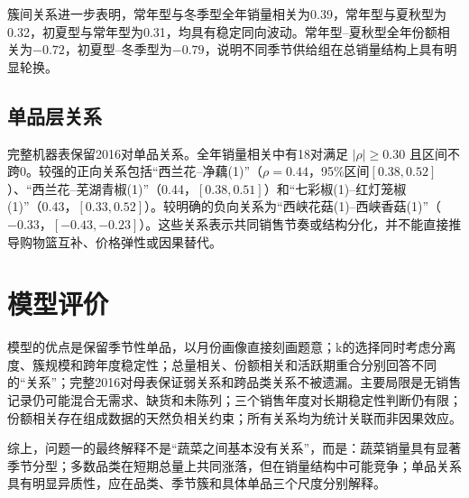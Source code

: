 \documentclass[UTF8,12pt]{ctexart}
\begin{document}
簇间关系进一步表明，常年型与冬季型全年销量相关为0.39，常年型与夏秋型为0.32，初夏型与常年型为0.31，均具有稳定同向波动。常年型--夏秋型全年份额相关为$-0.72$，初夏型--冬季型为$-0.79$，说明不同季节供给组在总销量结构上具有明显轮换。

\subsection{单品层关系}

完整机器表保留2016对单品关系。全年销量相关中有18对满足 $|\rho|\ge0.30$ 且区间不跨0。较强的正向关系包括“西兰花--净藕(1)”（$\rho=0.44$，95\%区间$[0.38,0.52]$）、“西兰花--芜湖青椒(1)”（0.44，$[0.38,0.51]$）和“七彩椒(1)--红灯笼椒(1)”（0.43，$[0.33,0.52]$）。较明确的负向关系为“西峡花菇(1)--西峡香菇(1)”（$-0.33$，$[-0.43,-0.23]$）。这些关系表示共同销售节奏或结构分化，并不能直接推导购物篮互补、价格弹性或因果替代。

\section{模型评价}

模型的优点是保留季节性单品，以月份画像直接刻画题意；k的选择同时考虑分离度、簇规模和跨年度稳定性；总量相关、份额相关和活跃期重合分别回答不同的“关系”；完整2016对母表保证弱关系和跨品类关系不被遗漏。主要局限是无销售记录仍可能混合无需求、缺货和未陈列；三个销售年度对长期稳定性判断仍有限；份额相关存在组成数据的天然负相关约束；所有关系均为统计关联而非因果效应。

综上，问题一的最终解释不是“蔬菜之间基本没有关系”，而是：蔬菜销量具有显著季节分型；多数品类在短期总量上共同涨落，但在销量结构中可能竞争；单品关系具有明显异质性，应在品类、季节簇和具体单品三个尺度分别解释。
\end{document}
